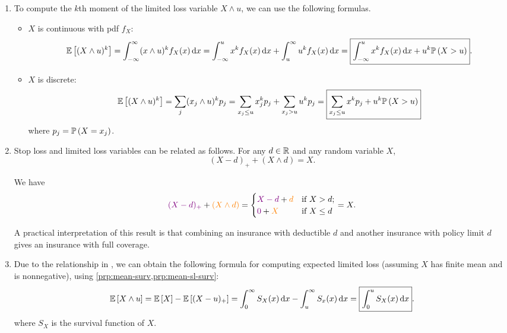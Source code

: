 \begin{enumerate}
\item \label{it:lim-loss-kth-moment-fmlas}
To compute the \(k\)th moment of the limited loss variable \(X\wedge u\),
we can use the following formulas.
\begin{itemize}
\item \(X\) is continuous with pdf \(f_X\):
\[
\mathbb{E}\left[(X\wedge u)^{k}\right]=\int_{-\infty}^{\infty}(x\wedge u)^{k}f_X(x)\dd{x}
=\int_{-\infty}^{u}x^kf_X(x)\dd{x}
+\int_{u}^{\infty}u^kf_X(x)\dd{x}
=\boxed{\int_{-\infty}^{u}x^kf_X(x)\dd{x}+u^k\mathbb{P}\left(X>u\right)}.
\]
\item \(X\) is discrete:
\[
\mathbb{E}\left[(X\wedge u)^{k}\right]
=\sum_{j}^{}(x_j\wedge u)^k p_j
=\sum_{x_j\le u}^{}x_j^kp_j+\sum_{x_j>u}^{}u^kp_j
=\boxed{\sum_{x_j\le u}^{}x^kp_j+u^k\mathbb{P}\left(X>u\right)}
\]
where \(p_j=\mathbb{P}\left(X=x_j\right)\).
\end{itemize}
\item \label{it:sl-limloss-relation}
Stop loss and limited loss variables can be related as follows. For any
\(d\in\mathbb{R}\) and any random variable \(X\),
\[
(X-d)_{+}+(X\wedge d)=X.
\]
\begin{pf}
We have
\[
{\color{violet}(X-d)_{+}}+{\color{orange}(X\wedge d)}
=\begin{cases}
{\color{violet}X-d}+{\color{orange}d}&\text{if }X>d;\\
{\color{violet}0}+{\color{orange}X}&\text{if }X\le d
\end{cases}
=X.
\]
\begin{center}
\end{center}
\end{pf}

\begin{note}
A practical interpretation of this result is that combining an insurance with
deductible \(d\) and another insurance with policy limit \(d\) gives an
insurance with full coverage.
\end{note}
\item Due to the relationship in , we can
obtain the following formula for computing expected limited loss (assuming
\(X\) has finite mean and is nonnegative), using
\cref{prp:mean-surv,prp:mean-sl-surv}:
\[
\mathbb{E}\left[X\wedge u\right]=\mathbb{E}\left[X\right]-\mathbb{E}\left[(X-u)_{+}\right]
=\int_{0}^{\infty}S_X(x)\dd{x}-\int_{u}^{\infty}S_x(x)\dd{x}
=\boxed{\int_{0}^{u}S_X(x)\dd{x}}.
\]
where \(S_X\) is the survival function of \(X\).
\end{enumerate}

